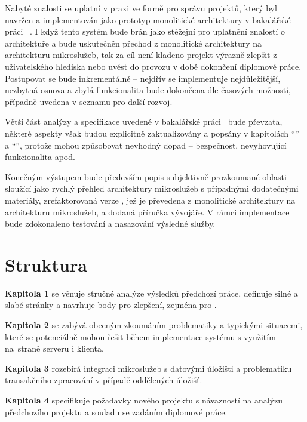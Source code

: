 Nabyté znalosti se uplatní v praxi ve formě  pro správu projektů, který byl navržen a implementován jako prototyp monolitické architektury v bakalářské práci ~\cite{bachelorthesis}.
I když tento systém bude brán jako stěžejní pro uplatnění znalostí o architektuře a bude uskutečněn přechod z monolitické architektury na architekturu mikroslužeb, tak za cíl není kladeno projekt výrazně zlepšit z uživatelského hlediska nebo uvést do provozu v době dokončení diplomové práce.
Postupovat se bude inkrementálně – nejdřív se implementuje nejdůležitější, nezbytná osnova a zbylá funkcionalita bude dokončena dle časových možností, případně uvedena v seznamu pro další rozvoj.

Větší část analýzy a specifikace uvedené v bakalářské práci~\cite{bachelorthesis} bude převzata, některé aspekty však budou explicitně zaktualizovány a popsány v kapitolách \enquote{} a \enquote{}, protože mohou způsobovat nevhodný dopad – bezpečnost, nevyhovující funkcionalita apod.

Konečným výstupem bude především popis subjektivně prozkoumané oblasti  sloužící jako rychlý přehled architektury mikroslužeb s případnými dodatečnými materiály, zrefaktorovaná verze , jež je převedena z monolitické architektury na architekturu mikroslužeb, a dodaná příručka vývojáře.
V rámci implementace bude zdokonaleno testování a nasazování výsledné služby.


\newpage



\section{Struktura}\label{sec:struktura}

\textbf{Kapitola 1} se věnuje stručné analýze výsledků předchozí práce, definuje silné a slabé stránky a navrhuje body pro zlepšení, zejména pro .

\textbf{Kapitola 2} se zabývá obecným zkoumáním problematiky  a typickými situacemi, které se potenciálně mohou řešit během implementace systému s využitím \\na~straně serveru i klienta.

\textbf{Kapitola 3} rozebírá integraci mikroslužeb s datovými úložišti a problematiku transakčního zpracování v případě oddělených úložišť.

\textbf{Kapitola 4} specifikuje požadavky nového projektu s návazností na analýzu předchozího projektu a souladu se zadáním diplomové práce.

